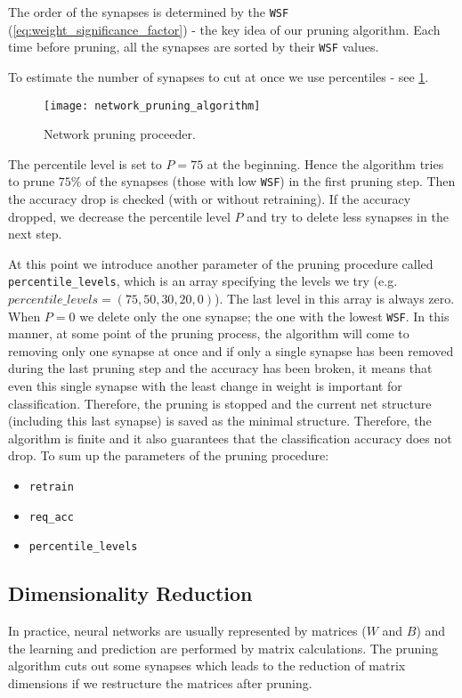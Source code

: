 The order of the synapses is determined by the \texttt{WSF} (\cref{eq:weight_significance_factor}) - the key idea of our pruning algorithm. Each time before pruning, all the synapses are sorted by their \texttt{WSF} values.

To estimate the number of synapses to cut at once we use percentiles - see \cref{fig:methods:network_pruning_proceeder}.

\begin{figure}[H]
  \centering
  \texttt{[image: network\_pruning\_algorithm]}
  \caption{Network pruning proceeder.}
  \label{fig:methods:network_pruning_proceeder}
\end{figure}

The percentile level is set to $ P = 75 $ at the beginning. Hence the algorithm tries to prune $ 75\% $ of the synapses (those with low \texttt{WSF}) in the first pruning step. Then the accuracy drop is checked (with or without retraining). If the accuracy dropped, we decrease the percentile level $ P $ and try to delete less synapses in the next step.

At this point we introduce another parameter of the pruning procedure called \texttt{percentile\_levels}, which is an array specifying the levels we try (e.g.  $percentile\_levels = (75, 50, 30, 20, 0) $). The last level in this array is always zero. When $ P = 0 $ we delete only the one synapse; the one with the lowest \texttt{WSF}. In this manner, at some point of the pruning process, the algorithm will come to removing only one synapse at once and if only a single synapse has been removed during the last pruning step and the accuracy has been broken, it means that even this single synapse with the least change in weight is important for classification. Therefore, the pruning is stopped and the current net structure (including this last synapse) is saved as the minimal structure. Therefore, the algorithm is finite and it also guarantees that the classification accuracy does not drop. To sum up the parameters of the pruning procedure:

\begin{itemize}
\item \texttt{retrain}
\item \texttt{req\_acc}
\item \texttt{percentile\_levels}
\end{itemize}

\subsection*{Dimensionality Reduction}
In practice, neural networks are usually represented by matrices ($ W $ and $ B $) and the learning and prediction are performed by matrix calculations. The pruning algorithm cuts out some synapses which leads to the reduction of matrix dimensions if we restructure the matrices after pruning.

